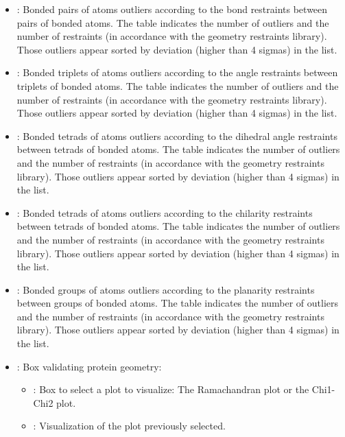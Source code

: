 \begin{itemize}
\begin{itemize}
\begin{itemize}
         \item {}: Bonded pairs of atoms outliers according to the bond restraints between pairs of bonded atoms. The  table indicates the number of outliers and the number of restraints (in accordance with the geometry restraints library). Those outliers appear sorted by deviation (higher than 4 sigmas) in the  list.
         \item {}: Bonded triplets of atoms outliers according to the angle restraints between triplets of bonded atoms. The  table indicates the number of outliers and the number of restraints (in accordance with the geometry restraints library). Those outliers appear sorted by deviation (higher than 4 sigmas) in the  list.
         \item {}: Bonded tetrads of atoms outliers  according to the dihedral angle restraints between tetrads of bonded atoms. The  table indicates the number of outliers and the number of restraints (in accordance with the geometry restraints library). Those outliers appear sorted by deviation (higher than 4 sigmas) in the  list.
         \item {}: Bonded tetrads of atoms outliers according to the chilarity restraints between tetrads of bonded atoms. The  table indicates the number of outliers and the number of restraints (in accordance with the geometry restraints library). Those outliers appear sorted by deviation (higher than 4 sigmas) in the  list.
         \item {}: Bonded groups of atoms outliers according to the planarity restraints between groups of bonded atoms. The  table indicates the number of outliers and the number of restraints (in accordance with the geometry restraints library). Those outliers appear sorted by deviation (higher than 4 sigmas) in the  list.
         \item {}: Box validating protein geometry:
         \begin{itemize}
          \item {}: Box to select a plot to visualize: The Ramachandran plot or the Chi1-Chi2 plot.
          \item {}: Visualization of the plot previously selected.

\end{itemize}
\end{itemize}
\end{itemize}
\end{itemize}
